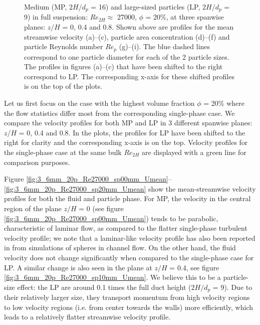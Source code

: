 \documentclass{jfm}
\begin{document}
\begin{figure}
\caption{Medium (MP, $2H/d_p$ = 16) and large-sized particles (LP, $2H/d_p$ = 9) in full suspension: $Re_{2H}\approx$ 27000, $\phi$ = 20\%, at three spanwise planes: $z/H$ = 0, 0.4 and 0.8. Shown above are profiles for the mean streamwise velocity (a)--(c), particle area concentration (d)--(f) and particle Reynolds number $Re_p$ (g)--(i). The blue dashed lines correspond to one particle diameter for each of the 2 particle sizes. The profiles in figures (a)--(c) that have been shifted to the right correspond to LP. The corresponding x-axis for these shifted profiles is on the top of the plots.}
\label{fig:3_6mm_20p_Re27000_Umean_phi_Rep}
\end{figure}

Let us first focus on the case with the highest volume fraction $\phi$ = 20\% where the flow statistics differ most from the corresponding single-phase case.
We compare the velocity profiles for both MP and LP in 3 different spanwise planes: $z/H$ = 0, 0.4 and 0.8. In the plots, the profiles for LP have been 
shifted to the right for clarity and the corresponding x-axis is on the top. Velocity profiles for the single-phase case at the same bulk $Re_{2H}$ are displayed with a green line for comparison purposes. 

Figure \ref{fig:3_6mm_20p_Re27000_sp00mm_Umean}--\ref{fig:3_6mm_20p_Re27000_sp20mm_Umean} show the mean-streamwise velocity profiles for both the fluid and particle phase. For MP, the velocity in the central region of the plane $z/H$ = 0 (see figure \ref{fig:3_6mm_20p_Re27000_sp00mm_Umean}) tends to be parabolic, characteristic of laminar flow, as compared to the flatter single-phase turbulent velocity profile; we note that a laminar-like velocity profile  has also been reported  in \citet{picano2015turbulent} from simulations of spheres in channel flow. 
On the other hand, the fluid velocity  does not change significantly when compared to the single-phase case for LP. A similar change is also seen in the plane at $z/H$ = 0.4, see figure \ref{fig:3_6mm_20p_Re27000_sp10mm_Umean}. We believe this to be a particle-size effect: the LP are around 0.1 times the full duct height ($2H/d_p$ = 9). Due to their relatively larger size, they transport momentum from high velocity regions to low velocity regions (i.e. from center towards the walls) more efficiently, which
 leads to a relatively flatter streamwise velocity profile. 
\end{document}
